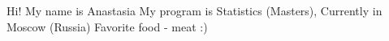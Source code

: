 Hi!
My name is Anastasia 
My program is Statistics (Masters), 
Currently in Moscow (Russia)
Favorite food - meat
:)
